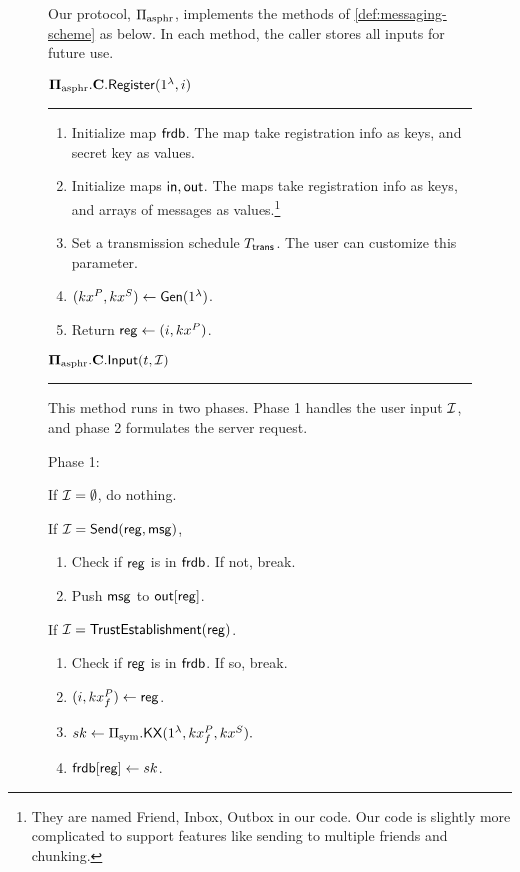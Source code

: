 \begin{figure}[h!]
\begin{framed}
\begin{definition}
Our protocol, $\Pi_{\text{asphr}}$, implements the methods of \cref{def:messaging-scheme} as below. In each method, the caller stores all inputs for future use.
\vspace{10pt}

$\mathbf{\Pi_{\text{asphr}}.C.\mathsf{Register}}(1^{\lambda}, i)$
\vspace{5pt}
\hrule
\vspace{5pt}
\begin{enumerate}
    \item Initialize map $\mathsf{frdb}$. The map take registration info as keys, and secret key as values.
    \item Initialize maps $\mathsf{in}, \mathsf{out}$. The maps take registration info as keys, and arrays of messages as values.\footnote{They are named Friend, Inbox, Outbox in our code. Our code is slightly more complicated to support features like sending to multiple friends and chunking.}
    \item Set a transmission schedule $T_{\mathsf{trans}}$. The user can customize this parameter.
    \item $(kx^P, kx^S) \leftarrow \mathsf{Gen}(1^{\lambda})$. 
    \item Return $\mathsf{reg} \leftarrow (i, kx^P)$.
\end{enumerate}

$\mathbf{\Pi_{\text{asphr}}.C.\mathsf{Input}}(t, \mathcal{I})$
\vspace{5pt}
\hrule
\vspace{5pt}
This method runs in two phases. Phase 1 handles the user input $\mathcal{I}$, and phase 2 formulates the server request.

Phase 1: 

If $\mathcal{I} = \emptyset$, do nothing. 

If $\mathcal{I} = \mathsf{Send}(\mathsf{reg}, \mathsf{msg})$, 

\begin{enumerate}
    \item Check if $\mathsf{reg}$ is in $\mathsf{frdb}$. If not, break.
    \item Push $\mathsf{msg}$ to $\mathsf{out}[\mathsf{reg}]$.
\end{enumerate}

If $\mathcal{I} = \mathsf{TrustEstablishment}(\mathsf{reg})$.
\begin{enumerate}
    \item Check if $\mathsf{reg}$ is in $\mathsf{frdb}$. If so, break.
    \item $(i, kx_f^P) \leftarrow \mathsf{reg}$.
    \item $sk \leftarrow \Pi_{\text{sym}}.\mathsf{KX}(1^{\lambda}, kx_f^P, kx^S).$
    \item $\mathsf{frdb}[\mathsf{reg}] \leftarrow sk$.
\end{enumerate}


\end{definition}
\end{framed}
\end{figure}
